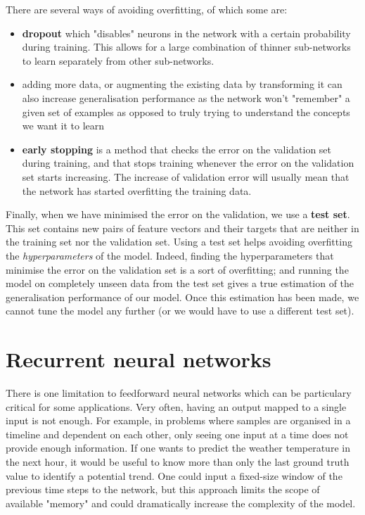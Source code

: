 There are several ways of avoiding overfitting, of which some are:
\begin{itemize}
	\item \textbf{dropout} \cite{dropout} which "disables" neurons in the 
		network with a certain probability during training. This allows
		for a large combination of thinner sub-networks to learn
		separately from other sub-networks.
	\item adding more data, or augmenting the existing data by transforming
		it can also increase generalisation performance as the network
		won't "remember" a given set of examples as opposed to truly
		trying to understand the concepts we want it to learn
	\item \textbf{early stopping} is a method that checks the error
		on the validation set during training, and that stops training
		whenever the error on the validation set starts increasing.
		The increase of validation error will usually mean that the
		network has started overfitting the training data.
\end{itemize}

Finally, when we have minimised the error on the validation, we use 
a \textbf{test set}. This set contains new pairs of feature vectors and their
targets that are neither in the training set nor the validation set. Using
a test set helps avoiding overfitting the \textit{hyperparameters} of the model.
Indeed, finding the hyperparameters that minimise the error on the validation
set is a sort of overfitting; and running the model on completely unseen
data from the test set gives a true estimation of the generalisation performance
of our model. Once this estimation has been made, we cannot tune the model
any further (or we would have to use a different test set).

\section{Recurrent neural networks}
There is one limitation to feedforward neural networks which can be particulary
critical for some applications. Very often, having an output mapped to a 
single input is not enough. For example, in problems where samples are organised
in a timeline and dependent on each other, only seeing one input at a time
does not provide enough information. If one wants to predict the weather
temperature in the next hour, it would be useful to know more than only the
last ground truth value to identify a potential trend. One 
could input a fixed-size window of the previous time steps to the network,
but this approach limits the scope of available "memory" and could dramatically
increase the complexity of the model.\\

